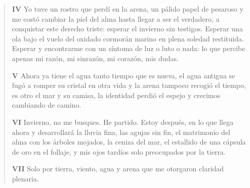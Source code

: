\documentclass[12pt]{article}
\begin{document}
\begin{verse}
\vspace{\baselineskip}
{\scshape\bfseries IV}
Yo tuve un rostro que perdí en la arena,  
un pálido papel de pesaroso  
y me costó cambiar la piel del alma  
hasta llegar a ser el verdadero,  
a conquistar este derecho triste:  
esperar el invierno sin testigos.  
Esperar una ola bajo el vuelo  
del oxidado cormorán marino  
en plena soledad restituida.  
Esperar y encontrarme con un síntoma  
de luz o luto  
o nada:  
lo que percibe apenas mi razón,  
mi sinrazón, mi corazón, mis dudas.  

\vspace{\baselineskip}
{\scshape\bfseries V}
Ahora ya tiene el agua tanto tiempo  
que es nueva, el agua antigua se fugó  
a romper su cristal en otra vida  
y la arena tampoco recogió  
el tiempo, es otro el mar y su camisa,  
la identidad perdió el espejo  
y crecimos cambiando de camino.  

\vspace{\baselineskip}
{\scshape\bfseries VI}
Invierno, no me busques. He partido.  
Estoy después, en lo que llega ahora  
y desarrollará la lluvia fina,  
las agujas sin fin, el matrimonio  
del alma con los árboles mojados,  
la ceniza del mar, el estallido  
de una cápsula de oro en el follaje,  
y mis ojos tardíos  
solo preocupados por la tierra.  

\vspace{\baselineskip}
{\scshape\bfseries VII}
Solo por tierra, viento, agua y arena  
que me otorgaron claridad plenaria.  

\end{verse}
\end{document}
